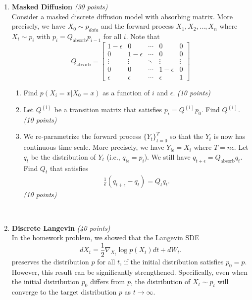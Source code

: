 \documentclass[12pt]{article}
\begin{document}
\begin{enumerate}
\begin{problem}
    \newpage~\newpage
\end{problem}


\item {\bf Masked Diffusion} {\it (30 points)}\\
Consider a masked discrete diffusion model with absorbing matrix.
More precisely, we have $X_0\sim p_{data}$ and the forward process $X_1, X_2, \dots, X_n$ where
$X_i\sim p_i$ with $p_i = Q_\text{absorb} p_{i-1}$ for all $i$. 
Note that
\[
Q_\text{absorb} = \left[ \begin{matrix}
    1 - \epsilon & 0 & \cdots & 0 & 0 \\
    0 & 1 - \epsilon & \cdots & 0 & 0 \\
    \vdots & \vdots & \ddots & \vdots & \vdots \\
    0 & 0 & \cdots & 1 - \epsilon & 0 \\
    \epsilon & \epsilon & \cdots & \epsilon & 1
\end{matrix} \right]
\]
\begin{enumerate}
    \item Find $p(X_i=x|X_0=x)$ as a function of $i$ and $\epsilon$. {\it (10 points)}
    \item Let $Q^{(i)}$ be a transition matrix that satisfies $p_i = Q^{(i)} p_0$. Find $Q^{(i)}$. {\it (10 points)}
    \item We re-parametrize the forward process $\{Y_t\}_{t=0}^T$ so that the $Y_t$ is now has continuous time scale.
    More precisely, we have $Y_{i\epsilon} = X_i$ where $T = n\epsilon$.
    Let $q_t$ be the distribution of $Y_t$ (i.e., $q_{i\epsilon} = p_i$).
    We still have $q_{t+\epsilon} = Q_\text{absorb} q_t$.
    Find $Q_t$ that satisfies
    \begin{align*}
        \frac{1}{\epsilon} (q_{t+\epsilon} - q_t) = Q_t q_t.
    \end{align*}
     {\it (10 points)}
\end{enumerate}
\begin{problem}
    \newpage~\newpage
\end{problem}



\item {\bf Discrete Langevin} {\it (40 points)}\\
In the homework problem, we showed that the Langevin SDE 
\[
dX_t=\frac{1}{2}\nabla_{X_t} \log p(X_t)dt+dW_t.
\]
preserves the distribution $p$ for all $t$, if the initial distribution satisfies $p_0=p$.
However, this result can be significantly strengthened. Specifically, even when the initial distribution $p_0$ differs from $p$,
the distribution of $X_t\sim p_t$ will converge to the target distribution $p$ as $t\rightarrow \infty$.


\end{enumerate}
\end{document}
